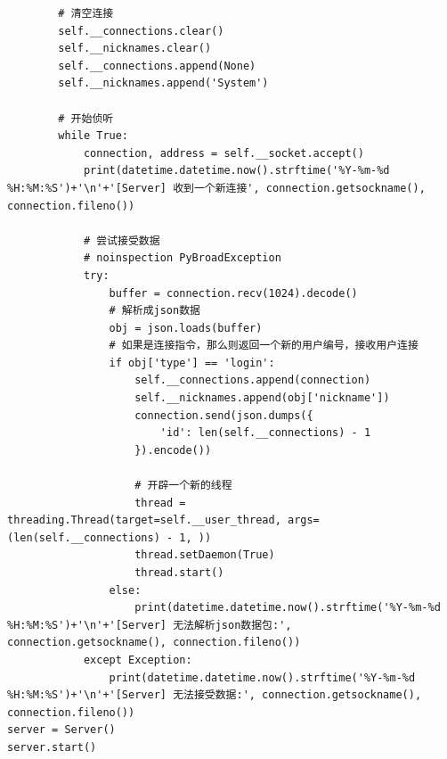 \documentclass[UTF8,a4paper]{article}
\begin{document}
\begin{lstlisting}
        # 清空连接
        self.__connections.clear()
        self.__nicknames.clear()
        self.__connections.append(None)
        self.__nicknames.append('System')

        # 开始侦听
        while True:
            connection, address = self.__socket.accept()
            print(datetime.datetime.now().strftime('%Y-%m-%d %H:%M:%S')+'\n'+'[Server] 收到一个新连接', connection.getsockname(), connection.fileno())

            # 尝试接受数据
            # noinspection PyBroadException
            try:
                buffer = connection.recv(1024).decode()
                # 解析成json数据
                obj = json.loads(buffer)
                # 如果是连接指令，那么则返回一个新的用户编号，接收用户连接
                if obj['type'] == 'login':
                    self.__connections.append(connection)
                    self.__nicknames.append(obj['nickname'])
                    connection.send(json.dumps({
                        'id': len(self.__connections) - 1
                    }).encode())

                    # 开辟一个新的线程
                    thread = threading.Thread(target=self.__user_thread, args=(len(self.__connections) - 1, ))
                    thread.setDaemon(True)
                    thread.start()
                else:
                    print(datetime.datetime.now().strftime('%Y-%m-%d %H:%M:%S')+'\n'+'[Server] 无法解析json数据包:', connection.getsockname(), connection.fileno())
            except Exception:
                print(datetime.datetime.now().strftime('%Y-%m-%d %H:%M:%S')+'\n'+'[Server] 无法接受数据:', connection.getsockname(), connection.fileno())
server = Server()
server.start()
\end{lstlisting}
\end{document}
